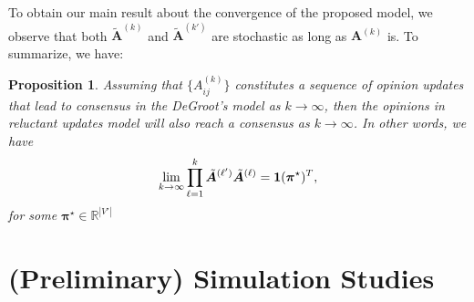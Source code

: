 \documentclass[letter]{article}
\newtheorem{prop}{Proposition}
\theoremstyle{remark}
\begin{document}
To obtain our main result about the convergence of the proposed model, we observe  that both $\tilde{\bm A}^{(k)}$ and $\tilde{\bm A}^{(k')}$ are stochastic as long as ${\bm A}^{(k)}$ is. To summarize, we have:
\begin{prop}
Assuming that $\{ A_{ij}^{(k)} \}$ constitutes a sequence of opinion updates that lead to  consensus in the DeGroot's model as $k \rightarrow \infty$, then the opinions in reluctant updates model will also reach a consensus  as $k \rightarrow \infty$. In other words, we have
\[
\lim_{k \rightarrow \infty} \prod_{\ell=1}^{k} \tilde{\bm A}^{(\ell')} \tilde{\bm A}^{(\ell)} = {\bf 1} ({\bm \pi}^\star)^T,
\]
for some ${\bm \pi}^\star \in \mathbb{R}^{|V'|}$
\end{prop}

\section{(Preliminary) Simulation Studies}


%
%




\end{document}
